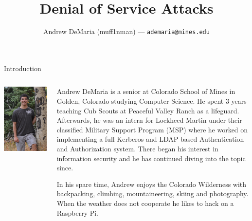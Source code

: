 \documentclass{beamer}
\title{
	Denial of Service Attacks
}
\author{
	Andrew DeMaria (muff1nman) --- \texttt{ademaria@mines.edu}
}
\begin{document}
\maketitle
\begin{frame}{Introduction}
	\begin{columns}
		\begin{column}{0.3\textwidth}
			\includegraphics[width=1\textwidth]{images/andrew.JPG}
		\end{column}
		\begin{column}{0.7\textwidth} %
			Andrew DeMaria is a senior at Colorado School of Mines in Golden, Colorado
			studying Computer Science. He spent 3 years teaching Cub Scouts at Peaceful
			Valley Ranch as a lifeguard. Afterwards, he was an intern for Lockheed Martin
			under their classified Military Support Program (MSP) where he worked on
			implementing a full Kerberos and LDAP based Authentication and Authorization
			system. There began his interest in information security and he has continued
			diving into the topic since.

			In his spare time, Andrew enjoys the Colorado Wilderness with backpacking,
			climbing, mountaineering, skiing and photography. When the weather does not
			cooperate he likes to hack on a Raspberry Pi.
		\end{column}
	\end{columns}
\end{frame}
\end{document}
